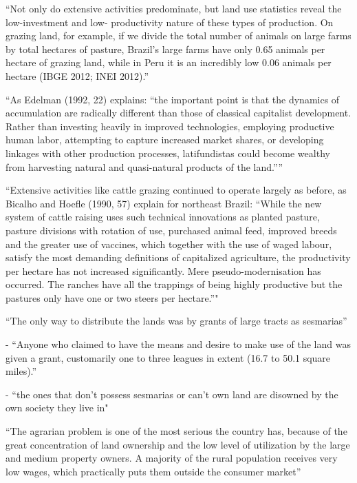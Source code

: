 \documentclass{article}
\begin{document}
\parencite{Carlson2019-mk}
``Not only do extensive activities predominate, but land use statistics reveal the low-investment and low- productivity nature of these types of production. On grazing land, for example, if we divide the total number  of animals on large farms by total hectares of pasture, Brazil’s large farms have only 0.65 animals per hectare  of grazing land, while in Peru it is an incredibly low 0.06 animals per hectare (IBGE 2012; INEI 2012).''

\parencite{Carlson2019-mk}
``As Edelman (1992, 22) explains: “the important point is that the dynamics of accumulation are 
radically different than those of classical capitalist development. Rather than investing heavily in improved  technologies,  employing  productive  human  labor,  attempting  to  capture  increased  market  shares,  or   developing linkages with other production processes, latifundistas could become wealthy from harvesting  natural and quasi-natural products of the land.”''

\parencite{Carlson2019-mk} ``Extensive  activities  like  
cattle grazing continued to operate largely as before, as Bicalho and Hoefle (1990, 57) explain for northeast  Brazil: “While the new system of cattle raising uses such technical innovations as planted pasture, pasture  divisions with rotation of use, purchased animal feed, improved breeds and the greater use of vaccines, which  together  with  the  use  of  waged  labour,  satisfy  the  most  demanding  definitions  of  capitalized  agriculture,   the productivity per hectare has not increased significantly. Mere pseudo-modernisation has occurred. The  ranches have all the trappings of being highly productive but the pastures only have one or two steers per  hectare.”"

\textcite{Diegues_Junior1959-ba}

\textcite{Smith1944-oi} ``The only way to distribute the lands was by grants of large tracts as sesmarias''

\textcite{Dean1971-iq} - ``Anyone who claimed to have the means and desire to make use of the land was given a grant, customarily one to three leagues in extent (16.7 to 50.1 square miles).''

\textcite{Simonsen2005-ps} - ``the ones that don't possess sesmarias or can't own land are disowned by the own society they live in"

\textcite[p.~1]{De_Oliveira_Andrade1980-xz}
``The agrarian problem is one of the most serious the country has, because of the great concentration of land ownership and the low level of utilization by the large and medium property owners. A majority of the rural population receives very low wages, which practically puts them outside the consumer market''
\end{document}
